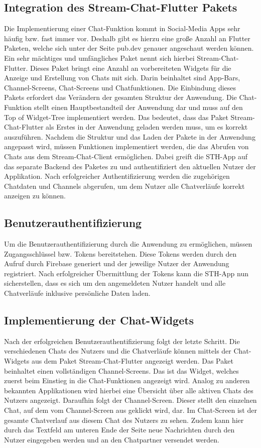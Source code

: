 \subsection{Integration des Stream-Chat-Flutter Pakets}
Die Implementierung einer Chat-Funktion kommt in Social-Media Apps sehr häufig bzw. fast immer vor. Deshalb gibt es hierzu eine große Anzahl an Flutter Paketen, welche sich unter der Seite pub.dev genauer angeschaut werden können. Ein sehr mächtiges und umfängliches Paket nennt sich hierbei Stream-Chat-Flutter. Dieses Paket bringt eine Anzahl an vorbereiteten Widgets für die Anzeige und Erstellung von Chats mit sich. Darin beinhaltet sind App-Bars, Channel-Screens, Chat-Screens und Chatfunktionen. Die Einbindung dieses Pakets erfordert das Verändern der gesamten Struktur der Anwendung. Die Chat-Funktion stellt einen Hauptbestandteil der Anwendung dar und muss auf den Top of Widget-Tree implementiert werden. Das bedeutet, dass das Paket Stream-Chat-Flutter als Erstes in der Anwendung geladen werden muss, um es korrekt auszuführen. Nachdem die Struktur und das Laden der Pakete in der Anwendung angepasst wird, müssen Funktionen implementiert werden, die das Abrufen von Chats aus dem Stream-Chat-Client ermöglichen. Dabei greift die STH-App auf das separate Backend des Paketes zu und authentifiziert den aktuellen Nutzer der Applikation. Nach erfolgreicher Authentifizierung werden die zugehörigen Chatdaten und Channels abgerufen, um dem Nutzer alle Chatverläufe korrekt anzeigen zu können.

\subsection{Benutzerauthentifizierung}
Um die Benutzerauthentifizierung durch die Anwendung zu ermöglichen, müssen Zugangsschlüssel bzw. Tokens bereitstehen. Diese Tokens werden durch den Aufruf durch Firebase generiert und der jeweilige Nutzer der Anwendung registriert. Nach erfolgreicher Übermittlung der Tokens kann die STH-App nun sicherstellen, dass es sich um den angemeldeten Nutzer handelt und alle Chatverläufe inklusive persönliche Daten laden. 

\subsection{Implementierung der Chat-Widgets}
Nach der erfolgreichen Benutzerauthentifizierung folgt der letzte Schritt. Die verschiedenen Chats des Nutzers und die Chatverläufe können mittels der Chat-Widgets aus dem Paket Stream-Chat-Flutter angezeigt werden. Das Paket beinhaltet einen vollständigen Channel-Screens. Das ist das Widget, welches zuerst beim Einstieg in die Chat-Funktionen angezeigt wird. Analog zu anderen bekannten Applikationen wird hierbei eine Übersicht über alle aktiven Chats des Nutzers angezeigt. Daraufhin folgt der Channel-Screen. Dieser stellt den einzelnen Chat, auf dem vom Channel-Screen aus geklickt wird, dar. Im Chat-Screen ist der gesamte Chatverlauf aus diesem Chat des Nutzers zu sehen. Zudem kann hier durch das Textfeld am unteren Ende der Seite neue Nachrichten durch den Nutzer eingegeben werden und an den Chatpartner versendet werden.

